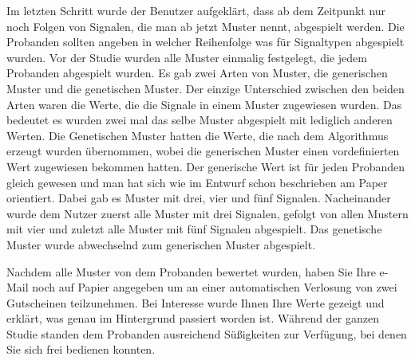 Im letzten Schritt wurde der Benutzer aufgekl{\"a}rt, dass ab dem Zeitpunkt nur noch Folgen von Signalen, die man ab jetzt Muster nennt, abgespielt werden.
Die Probanden sollten angeben in welcher Reihenfolge was f{\"u}r Signaltypen abgespielt wurden. 
Vor der Studie wurden alle Muster einmalig festgelegt, die jedem Probanden abgespielt wurden.
Es gab zwei Arten von Muster, die generischen Muster und die genetischen Muster. 
Der einzige Unterschied zwischen den beiden Arten waren die Werte, die die Signale in einem Muster zugewiesen wurden. 
Das bedeutet es wurden zwei mal das selbe Muster abgespielt mit lediglich anderen Werten. 
Die Genetischen Muster hatten die Werte, die nach dem Algorithmus erzeugt wurden {\"u}bernommen, wobei die generischen Muster einen vordefinierten Wert zugewiesen bekommen hatten. 
Der generische Wert ist f{\"u}r jeden Probanden gleich gewesen und man hat sich wie im Entwurf schon beschrieben am Paper \cite{pescara2016ruttelflug} orientiert.
Dabei gab es Muster mit drei, vier und f{\"u}nf Signalen. 
Nacheinander wurde dem Nutzer zuerst alle Muster mit drei Signalen, gefolgt von allen Mustern mit vier und zuletzt alle Muster mit f{\"u}nf Signalen abgespielt. 
Das genetische Muster wurde abwechselnd zum generischen Muster abgespielt. 

Nachdem alle Muster von dem Probanden bewertet wurden, haben Sie Ihre e-Mail noch auf Papier angegeben um an einer automatischen Verlosung von zwei Gutscheinen teilzunehmen. 
Bei Interesse wurde Ihnen Ihre Werte gezeigt und erkl{\"a}rt, was genau im Hintergrund passiert worden ist. 
W{\"a}hrend der ganzen Studie standen dem Probanden ausreichend S{\"u}{\ss}igkeiten zur Verf{\"u}gung, bei denen Sie sich frei bedienen konnten.

